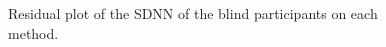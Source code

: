 \begin{figure}[!htb]
\begin{minipage}{0.45\textwidth}
        \caption{Residual plot of the SDNN of the blind participants on each method.}
        \label{fig:residplot_gsr_two_way_blind}
    \end{minipage}
\end{figure}




\FloatBarrier

